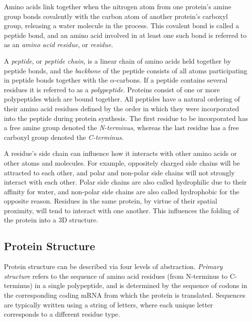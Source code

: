 Amino acids link together when the nitrogen atom from one protein's amine group bonds covalently with the carbon atom of another protein's carboxyl group, releasing a water molecule in the process.
This covalent bond is called a peptide bond, and an amino acid involved in at least one such bond is referred to as an \textit{amino acid residue}, or \textit{residue}.

A \textit{peptide}, or \textit{peptide chain}, is a linear chain of amino acids held together by peptide bonds, and the \textit{backbone} of the peptide consists of all atoms participating in peptide bonds together with the $\alpha$-carbons.
If a peptide contains several residues it is referred to as a \textit{polypeptide}.
Proteins consist of one or more polypeptides which are bound together.
All peptides have a natural ordering of their amino acid residues defined by the order in which they were incorporated into the peptide during protein synthesis.
The first residue to be incorporated has a free amine group denoted the \textit{N-terminus}, whereas the last residue has a free carboxyl group denoted the \textit{C-terminus}.


A residue's side chain can influence how it interacts with other amino acids or other atoms and molecules. For example, oppositely charged side chains will be attracted to each other, and polar and non-polar side chains will not strongly interact with each other. 
Polar side chains are also called hydrophilic due to their affinity for water, and non-polar side chains are also called hydrophobic for the opposite reason.
Residues in the same protein, by virtue of their spatial proximity, will tend to interact with one another. 
This influences the folding of the protein into a 3D structure.



\subsection{Protein Structure}

Protein structure can be described via four levels of abstraction. 
\textit{Primary structure} refers to the sequence of amino acid residues (from N-terminus to C-terminus) in a single polypeptide, and is determined by the sequence of codons in the corresponding coding mRNA from which the protein is translated.
Sequences are typically written using a string of letters, where each unique letter corresponds to a different residue type. 

